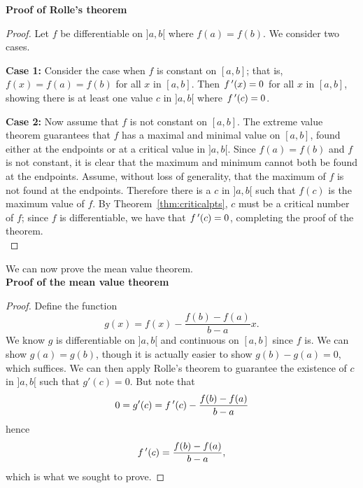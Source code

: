 \noindent\textbf{Proof of Rolle's theorem}
\begin{proof}
Let $f$ be differentiable on $]a,b[$ where $f(a)=f(b)$. We consider two cases. 

\noindent\textbf{Case 1:} Consider the case when $f$ is constant on $[a,b]$; that is, $f(x) = f(a) = f(b)$ for all $x$ in $[a,b]$. Then $f\,'(x) = 0$ for all $x$ in $[a,b]$, showing there is at least one value $c$ in $]a,b[$ where $f\,'(c)=0$.

\noindent\textbf{Case 2:} Now assume that $f$ is not constant on $[a,b]$. The extreme value theorem guarantees that $f$ has a maximal and minimal value on $[a,b]$, found either at the endpoints or at a critical value in $]a,b[$. Since $f(a)=f(b)$ and $f$ is not constant, it is clear that the maximum and minimum cannot both be found at the endpoints. Assume, without loss of generality, that the maximum of $f$ is not found at the endpoints. Therefore there is a $c$ in $]a,b[$ such that $f(c)$ is the maximum value of $f$. By Theorem~\ref{thm:criticalpts}, $c$ must be a critical number of $f$; since $f$ is differentiable, we have that $f\,'(c) = 0$, completing the proof of the theorem. \\
\end{proof}
We can now prove the mean value theorem.\\

\noindent\textbf{Proof of the mean value theorem}
\begin{proof}
Define the function $$g(x) = f(x) - \frac{f(b)-f(a)}{b-a}x.$$  We know $g$ is differentiable on $]a,b[$ and  continuous on $[a,b]$ since $f$ is. We can show $g(a)=g(b)$, though it is actually easier to show $g(b)-g(a)=0$, which suffices. We can then apply Rolle's theorem to guarantee the existence of $c$ in %
$]a,b[$ such that $g'(c) = 0$.  But note that $$0= g'(c) = f\,'(c) - \frac{f(b)-f(a)}{b-a}$$ hence $$f\,'(c) = \frac{f(b)-f(a)}{b-a},$$ which is what we sought to prove.
\end{proof}

\fi

	\checkoddpage
{}

